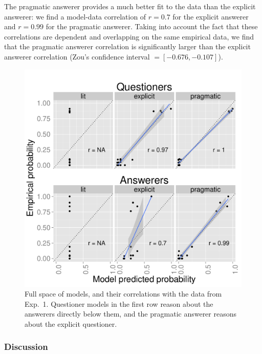 \documentclass[12pt, floatsintext, jou]{apa6}
\begin{document}
The pragmatic answerer provides a much better fit to the data than the explicit answerer: we find a model-data correlation of $r = 0.7$ for the explicit answerer and $r = 0.99$ for the pragmatic answerer.  Taking into account the fact that these correlations are dependent and overlapping on the same empirical data, we find that the pragmatic answerer correlation is significantly larger than the explicit answerer correlation (Zou's confidence interval $= [-0.676, -0.107]$). 
%
\begin{figure}[t!]
\begin{center}
\includegraphics[scale=.75]{Exp3ModelFits.pdf}
\end{center}
\vspace{-.5cm}
\caption{Full space of models, and their correlations with the data from Exp.~1. Questioner models in the first row reason about the answerers directly below them, and the pragmatic answerer reasons about the explicit questioner.}
\label{fig:Exp3ModelSpace}
\vspace{-.15cm}
\end{figure}
%

\subsubsection{Discussion}
\end{document}
